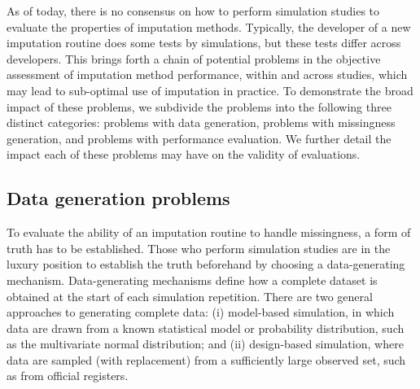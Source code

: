 \documentclass[bimj,fleqn]{w-art}
\begin{document}
As of today, there is no consensus on how to perform simulation studies to evaluate the properties of imputation methods. Typically, the developer of a new imputation routine does some tests by simulations, but these tests differ across developers. This brings forth a chain of potential problems in the objective assessment of imputation method performance, within and across studies, which may lead to sub-optimal use of imputation in practice. To demonstrate the broad impact of these problems, we subdivide the problems into the following three distinct categories: problems with data generation, problems with missingness generation, and problems with performance evaluation. We further detail the impact each of these problems may have on the validity of evaluations. 


\subsection{Data generation problems}

To evaluate the ability of an imputation routine to handle missingness, a form of truth has to be established. Those who perform simulation studies are in the luxury position to establish the truth beforehand by choosing a data-generating mechanism. Data-generating mechanisms define how a complete dataset is obtained at the start of each simulation repetition. There are two general approaches to generating complete data: (i) model-based simulation, in which data are drawn from a known statistical model or probability distribution, such as the multivariate normal distribution; and (ii) design-based simulation, where data are sampled (with replacement) from a sufficiently large observed set, such as from official registers.
\end{document}
